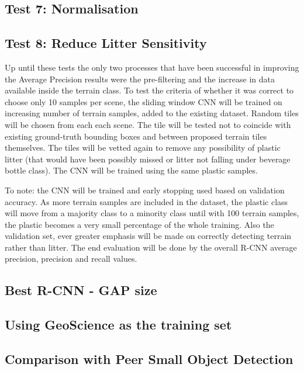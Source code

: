 \documentclass{IEEEtran}
\begin{document}
\subsection{Test 7: Normalisation}


\subsection{Test 8: Reduce Litter Sensitivity}

Up until these tests the only two processes that have been successful in improving the Average Precision results were the pre-filtering and the increase in data available inside the terrain class. To test the criteria of whether it was correct to choose only 10 samples per scene, the sliding window CNN will be trained on increasing number of terrain samples, added to the existing dataset. Random tiles will be chosen from each each scene. The tile will be tested not to coincide with existing ground-truth bounding boxes and between proposed terrain tiles themselves. The tiles will be vetted again to remove any possibility of plastic litter (that would have been possibly missed or litter not falling under beverage bottle class). The CNN will be trained using the same 
plastic samples.

To note: the CNN will be trained and early stopping used based on validation accuracy. As more terrain samples are included in the dataset, the plastic class will move from a majority class to a minority class until with 100 terrain samples, the plastic becomes a very small percentage of the whole training. Also the validation set, ever greater emphasis will be made on correctly detecting terrain rather than litter. The end evaluation will be done by the overall R-CNN average precision, precision and recall values. 

\subsection{Best R-CNN - GAP size}

\subsection{Using GeoScience as the training set}


\subsection{Comparison with Peer Small Object Detection}
\end{document}
